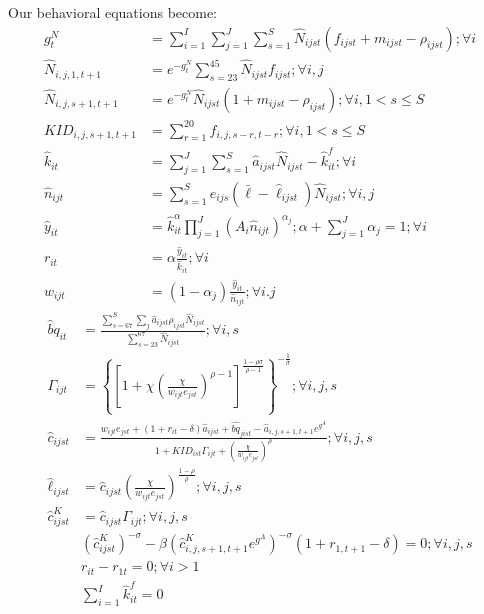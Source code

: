 \documentclass[letterpaper,12pt]{article}
\theoremstyle{definition}
\numberwithin{equation}{section}
\begin{document}
\begin{spacing}{1.5}
	Our behavioral equations become:
	\begin{align}
		g^N_t & = \sum_{i=1}^I \sum_{j=1}^J \sum_{s=1}^S \hat N_{ijst} (f_{ijst}+m_{ijst}-\rho_{ijst}) ; \forall i\\
		\hat N_{i,j,1,t+1} & = e^{-g^N_t}\sum_{s=23}^{45} \hat N_{ijst} f_{ijst} ; \forall i,j\\
		\hat N_{i,j,s+1,t+1} & = e^{-g^N_t}\hat N_{ijst} (1+m_{ijst}-\rho_{ijst}); \forall i, 1<s\le S \\
		KID_{i,j,s+1,t+1} & = \sum_{r=1}^{20} f_{i,j,s-r,t-r}; \forall i, 1<s\le S \\
		\hat k_{it} & = \sum_{j=1}^J \sum_{s=1}^S \hat a_{ijst} \hat N_{ijst} - \hat k_{it}^f; \forall i \\
		\hat n_{ijt} & = \sum_{s=1}^S e_{ijs} (\bar \ell - \hat \ell_{ijst} ) \hat N_{ijst}; \forall i,j \\
		\hat y_{it} & = \hat k_{it}^\alpha \prod_{j=1}^J \left( A_{i} \hat n_{ijt} \right)^{\alpha_j}; \alpha + \sum_{j=1}^J \alpha_j = 1 ; \forall i \\
		r_{it} & = \alpha \frac{\hat y_{it}}{\hat k_{it}}; \forall i \\
		w_{ijt} & = (1-\alpha_j) \frac{\hat y_{it}}{\hat n_{ijt}}; \forall i.j
	\end{align}
	\begin{align}
		\hat bq_{it} & = \frac{\sum_{s=67}^S \sum_j \hat a_{ijst} \rho_{ijst} \hat N_{ijst}}{\sum_{s=23}^{67} \hat N_{ijst}} ; \forall i,s \\
		\Gamma_{ijt} & = \left\{ \left[1 + \chi \left(\frac{\chi}{w_{ijt} e_{jst}}\right)^{\rho-1}\right]^{\tfrac{1-\rho \sigma}{\rho-1}} \right\}^{-\tfrac{1}{\sigma}}; \forall i,j,s \\
    	\hat c_{ijst} & = \frac{w_{ijt} e_{jst} + (1+r_{it}-\delta)\hat a_{ijst} + \hat{bq}_{jist} - \hat a_{i,j,s+1,t+1} e^{g^A}} {1 + KID_{ist}\Gamma_{ijt} + \left(\tfrac{\chi}{w_{ijt}e_{jst}}\right)^\rho}; \forall i,j,s \\
		\hat \ell_{ijst} & = \hat c_{ijst} \left(\frac{\chi}{w_{ijt}e_{jst}}\right)^{\frac{1-\rho}{\rho}} ; \forall i,j,s \\
		\hat c^K_{ijst} & = \hat c_{ijst} \Gamma_{ijt}; \forall i,j,s \\
		& \left({\hat c^K_{ijst}}\right)^{-\sigma} - \beta \left(\hat c^K_{i,j,s+1,t+1} e^{g^A}\right)^{-\sigma}(1+r_{1,t+1}-\delta) = 0; \forall i,j,s \\
		& r_{it} - r_{1t} = 0; \forall i>1 \\
		& \sum_{i=1}^I \hat k^f_{it} = 0
	\end{align}



\end{spacing}
\end{document}
